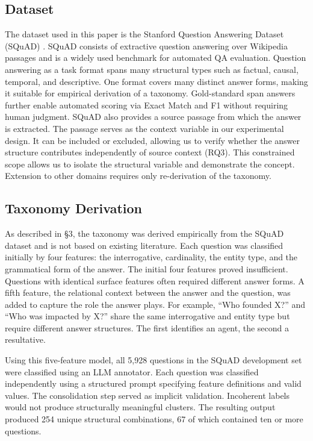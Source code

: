 \documentclass{article}
\begin{document}
\subsection{Dataset}

The dataset used in this paper is the Stanford Question Answering Dataset (SQuAD) \cite{rajpurkar2016squad}. SQuAD consists of extractive question answering over Wikipedia passages and is a widely used benchmark for automated QA evaluation. Question answering as a task format spans many structural types such as factual, causal, temporal, and descriptive. One format covers many distinct answer forms, making it suitable for empirical derivation of a taxonomy. Gold-standard span answers further enable automated scoring via Exact Match and F1 without requiring human judgment. SQuAD also provides a source passage from which the answer is extracted. The passage serves as the context variable in our experimental design. It can be included or excluded, allowing us to verify whether the answer structure contributes independently of source context (RQ3). This constrained scope allows us to isolate the structural variable and demonstrate the concept. Extension to other domains requires only re-derivation of the taxonomy.

\subsection{Taxonomy Derivation}

As described in \S3, the taxonomy was derived empirically from the SQuAD dataset and is not based on existing literature. Each question was classified initially by four features: the interrogative, cardinality, the entity type, and the grammatical form of the answer. The initial four features proved insufficient. Questions with identical surface features often required different answer forms. A fifth feature, the relational context between the answer and the question, was added to capture the role the answer plays. For example, ``Who founded X?'' and ``Who was impacted by X?'' share the same interrogative and entity type but require different answer structures. The first identifies an agent, the second a resultative.

Using this five-feature model, all 5,928 questions in the SQuAD development set were classified using an LLM annotator. Each question was classified independently using a structured prompt specifying feature definitions and valid values. The consolidation step served as implicit validation. Incoherent labels would not produce structurally meaningful clusters. The resulting output produced 254 unique structural combinations, 67 of which contained ten or more questions.
\end{document}
